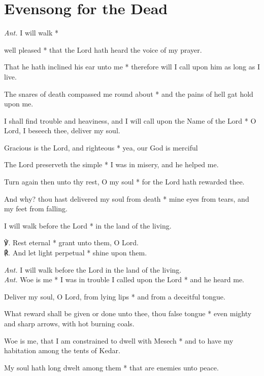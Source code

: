 \section{Evensong for the Dead}
\textit{Ant.} I will walk *
\par
{} well pleased * that the Lord hath heard the voice of my prayer.
\par
That he hath inclined his ear unto me * therefore will I call upon him as long as I live.
\par
The snares of death compassed me round about * and the pains of hell gat hold upon me.
\par
I shall find trouble and heaviness, and I will call upon the Name of the Lord * O Lord, I beseech thee, deliver my soul.
\par
Gracious is the Lord, and righteous * yea, our God is merciful
\par
The Lord preserveth the simple * I was in misery, and he helped me.
\par
Turn again then unto thy rest, O my soul * for the Lord hath rewarded thee.
\par
And why? thou hast delivered my soul from death * mine eyes from tears, and my feet from falling.
\par
I will walk before the Lord * in the land of the living.\\
\par\noindent
℣. Rest eternal * grant unto them, O Lord.\\
℟. And let light perpetual * shine upon them.\\
\par\noindent
\textit{Ant.} I will walk before the Lord in the land of the living.\\
\textit{Ant.} Woe is me *
 I was in trouble I called upon the Lord * and he heard me.
\par
Deliver my soul, O Lord, from lying lips * and from a deceitful tongue.
\par
What reward shall be given or done unto thee, thou false tongue * even mighty and sharp arrows, with hot burning coals.
\par
Woe is me, that I am constrained to dwell with Mesech * and to have my habitation among the tents of Kedar.
\par
My soul hath long dwelt among them * that are enemies unto peace.
\par
